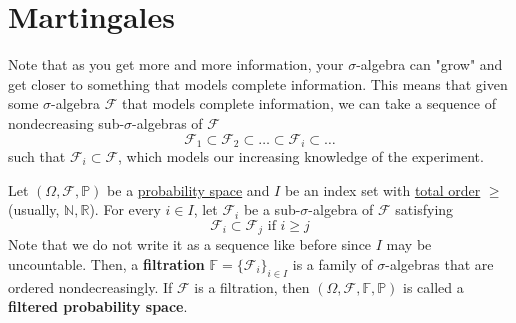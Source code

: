 \section{Martingales}

  Note that as you get more and more information, your $\sigma$-algebra can "grow" and get closer to something that models complete information. This means that given some $\sigma$-algebra $\mathcal{F}$ that models complete information, we can take a sequence of nondecreasing sub-$\sigma$-algebras of $\mathcal{F}$ 
  \begin{equation}
    \mathcal{F}_1 \subset \mathcal{F}_2 \subset \ldots \subset \mathcal{F}_i \subset \ldots
  \end{equation}
  such that $\mathcal{F}_i \subset \mathcal{F}$, which models our increasing knowledge of the experiment. 

  \begin{definition}[Filtration]
    \label{def:filtration}
    Let $(\Omega, \mathcal{F}, \mathbb{P})$ be a \hyperref[def:probability-space]{probability space} and $I$ be an index set with \hyperref[st-def:total-order]{total order} $\geq$ (usually, $\mathbb{N}, \mathbb{R}$). For every $i \in I$, let $\mathcal{F}_i$ be a sub-$\sigma$-algebra of $\mathcal{F}$ satisfying 
    \begin{equation}
      \mathcal{F}_i \subset \mathcal{F}_j \text{ if } i \geq j
    \end{equation}
    Note that we do not write it as a sequence like before since $I$ may be uncountable. Then, a \textbf{filtration} $\mathbb{F} = \{\mathcal{F}_i\}_{i \in I}$ is a family of $\sigma$-algebras that are ordered nondecreasingly. If $\mathcal{F}$ is a filtration, then $(\Omega, \mathcal{F}, \mathbb{F}, \mathbb{P})$ is called a \textbf{filtered probability space}. 
  \end{definition}

